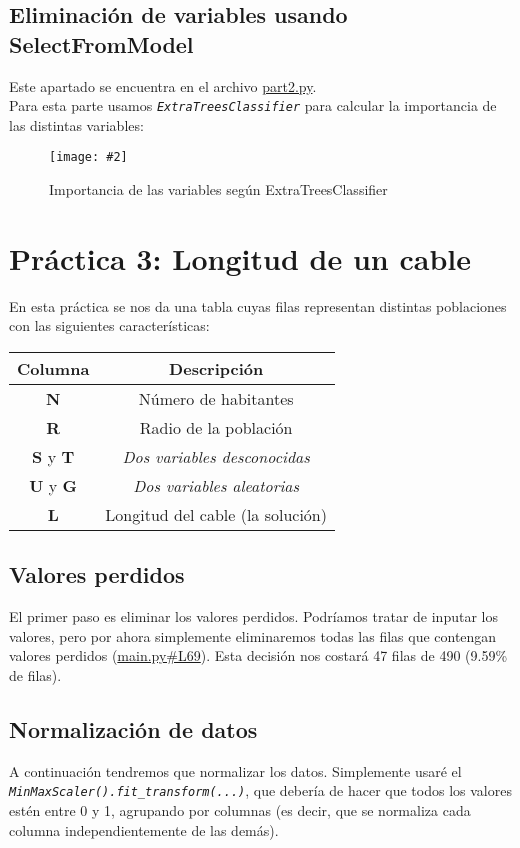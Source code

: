 \documentclass[
12pt, 
spanish, 
singlespacing,
headsepline
]{article}
\newcommand{\smallimage}[2]{
\begin{figure}[H]
	\caption{#1}
	\centering
	\texttt{[image: \#2]}
\end{figure}
}
\begin{document}
\subsection{Eliminación de variables usando SelectFromModel}
Este apartado se encuentra en el archivo \href{https://github.com/uo272509/InteligenciaNegocioPL/blob/7f59f8fb2b83986595ab9083fa9a6d28ed39c67c/Prac2/part2.py}{part2.py}.\\

Para esta parte usamos \texttt{\textit{ExtraTreesClassifier}} para calcular la importancia de las distintas variables:
\smallimage{Importancia de las variables según ExtraTreesClassifier}{pl2/Figure_8.png}
\newpage

\section{Práctica 3: Longitud de un cable}
En esta práctica se nos da una tabla cuyas filas representan distintas poblaciones con las siguientes características:
\begin{center}
\begin{tabular}{|c|c|}
\hline 
Columna & Descripción\\ 
\hline \textbf{N} & Número de habitantes\\
\hline \textbf{R} & Radio de la población\\
\hline \textbf{S} y \textbf{T} & \textit{Dos variables desconocidas}\\
\hline \textbf{U} y \textbf{G} & \textit{Dos variables aleatorias}\\
\hline \textbf{L} & Longitud del cable (la solución)\\
\hline 
\end{tabular}
\end{center}

\subsection{Valores perdidos}
El primer paso es eliminar los valores perdidos. Podríamos tratar de inputar los valores, pero por ahora simplemente eliminaremos todas las filas que contengan valores perdidos (\href{https://github.com/uo272509/InteligenciaNegocioPL/blob/2cbbd80f0cc88aa40bd462bec7e322e89a958301/Prac3/main.py\#L69}{main.py\#L69}). Esta decisión nos costará 47 filas de 490 (9.59\% de filas).

\subsection{Normalización de datos}
A continuación tendremos que normalizar los datos. Simplemente usaré el \texttt{\textit{MinMaxScaler().fit_transform(...)}}, que debería de hacer que todos los valores estén entre 0 y 1, agrupando por columnas (es decir, que se normaliza cada columna independientemente de las demás).
\end{document}
